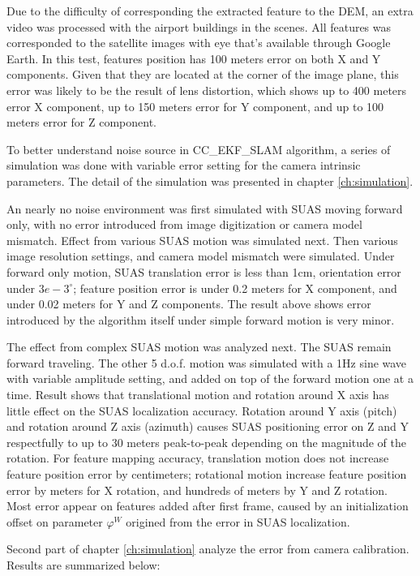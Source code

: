Due to the difficulty of corresponding the extracted feature to the
DEM, an extra video was processed with the airport buildings in the
scenes. All features was corresponded to the satellite images with eye
that's available through Google Earth. In this test, features position
has 100 meters error on both X and Y components. Given that they are
located at the corner of the image plane, this error was likely to be
the result of lens distortion, which shows up to 400 meters error X
component, up to 150 meters error for Y component, and up to 100
meters error for Z component. 

To better understand noise source in CC\_EKF\_SLAM algorithm, a series
of simulation was done with variable error setting for the camera
intrinsic parameters. The detail of the simulation was presented in
chapter \ref{ch:simulation}. 

An nearly no noise environment was first simulated with SUAS moving
forward only, with no error introduced from image digitization or
camera model mismatch. Effect from various SUAS motion was simulated
next. Then various image resolution settings, and camera model
mismatch were simulated. Under forward only motion, SUAS translation
error is less than 1cm, orientation error under $3e-3^\circ$; feature
position error is under 0.2 meters for X component, and under 0.02
meters for Y and Z components. The result above shows error introduced
by the algorithm itself under simple forward motion is very minor.

The effect from complex SUAS motion was analyzed next. The SUAS remain
forward traveling. The other 5 d.o.f. motion was simulated with a 1Hz
sine wave with variable amplitude setting, and added on top of the
forward motion one at a time. Result shows that translational motion
and rotation around X axis has little effect on the SUAS localization
accuracy. Rotation around Y axis (pitch) and rotation around Z axis
(azimuth) causes SUAS positioning error on Z and Y respectfully to up
to 30 meters peak-to-peak depending on the magnitude of the rotation.
For feature mapping accuracy, translation motion does not increase
feature position error by centimeters; rotational motion increase
feature position error by meters for X rotation, and hundreds of
meters by Y and Z rotation. Most error appear on features added after
first frame, caused by an initialization offset on parameter
$\varphi^W$ origined from the error in SUAS localization.

Second part of chapter \ref{ch:simulation} analyze the error from
camera calibration. Results are summarized below:

